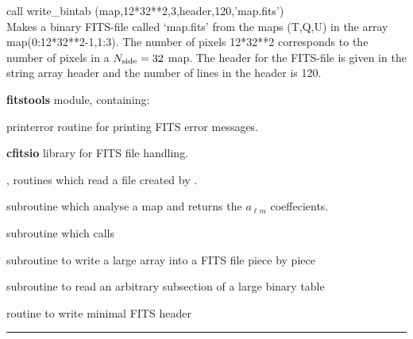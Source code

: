 \begin{example}
{
call write\_bintab (map,12*32**2,3,header,120,'map.fits')  \\
}
{
Makes a binary FITS-file called `map.fits' from the \healpix maps (T,Q,U) in the array map(0:12*32**2-1,1:3). The number of pixels 12*32**2 corresponds to the number of pixels in a $N_\mathrm{side}=32$ \healpix map. The header for the FITS-file is given in the string array header and the number of lines in the header is 120. 
}
\end{example}
\begin{modules}
  \begin{sulist}{} %
  \item[\textbf{fitstools}] module, containing:
  \item[printerror] routine for printing FITS error messages.
  \item[\textbf{cfitsio}] library for FITS file handling.		
  \end{sulist}
\end{modules}

\begin{related}
  \begin{sulist}{} %
  \item[\htmlref{input\_map}{sub:input_map}, \htmlref{read\_bintab}{sub:read_bintab}] routines which read a file created by \thedocid. 
  \item[\htmlref{map2alm}{sub:map2alm}] subroutine which analyse a map and returns the $a_{\ell m}$ coeffecients.
  \item[\htmlref{output\_map}{sub:output_map}] subroutine which calls \thedocid
  \item[\htmlref{write\_bintabh}{sub:write_bintabh}] subroutine to write a large
array into a FITS file piece by piece
  \item[\htmlref{input\_tod*}{sub:input_tod}] subroutine to read an arbitrary subsection of
  a large binary table
  \item[\htmlref{write\_minimal\_header}{sub:write_minimal_header}] routine to write minimal FITS header\end{sulist}
\end{related}

\rule{\hsize}{2mm}

\newpage
